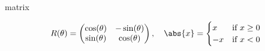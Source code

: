 \copyrightVincent



	


\begin{saveblock}{matrix}
	\begin{highlightblock}[gobble=8,linewidth=\textwidth,framexleftmargin=0.25em]
		\begin{align*}
			R(\theta) = \begin{pmatrix}
				\cos(\theta) & -\sin(\theta)\\
				\sin(\theta) & \cos(\theta)
			\end{pmatrix},\quad
			\abs{x} = \begin{cases}
				x & \text{if $ x \geq 0$}\\
				-x & \text{if $ x < 0$}
			\end{cases}
		\end{align*}
	\end{highlightblock}
\end{saveblock}

